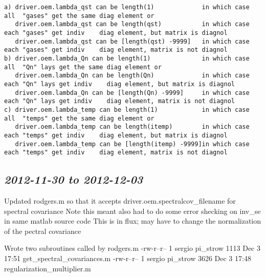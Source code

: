 \documentclass[11pt]{article}
\begin{document}
\begin{itemize}
\begin{small}
\begin{verbatim}
a) driver.oem.lambda_qst can be length(1)             in which case all  "gases" get the same diag element or
   driver.oem.lambda_qst can be length(qst)           in which case each "gases" get indiv    diag element, but matrix is diagnol
   driver.oem.lambda_qst can be [length(qst) -9999]   in which case each "gases" get indiv    diag element, matrix is not diagnol
b) driver.oem.lambda_Qn can be length(1)              in which case all  "Qn" lays get the same diag element or
   driver.oem.lambda_Qn can be length(Qn)             in which case each "Qn" lays get indiv    diag element, but matrix is diagnol
   driver.oem.lambda_Qn can be [length(Qn) -9999]     in which case each "Qn" lays get indiv    diag element, matrix is not diagnol
c) driver.oem.lambda_temp can be length(1)            in which case all  "temps" get the same diag element or
   driver.oem.lambda_temp can be length(itemp)        in which case each "temps" get indiv    diag element, but matrix is diagnol
   driver.oem.lambda_temp can be [length(itemp) -9999]in which case each "temps" get indiv    diag element, matrix is not diagnol
\end{verbatim}
\end{small}
\end{itemize}

\subsection{\textit{2012-11-30 to 2012-12-03}}
\label{sec-2_9}
Updated rodgers.m so that it accepts driver.oem.spectralcov_filename for spectral covariance
Note this meant also had to do some error shecking on inv_se in same matlab source code
This is in flux; may have to change the normalization of the pectral covariance

Wrote two subroutines called by rodgers.m
  -rw-r--r-- 1 sergio pi_strow 1113 Dec  3 17:51 get_spectral_covariances.m
  -rw-r--r-- 1 sergio pi_strow 3626 Dec  3 17:48 regularization_multiplier.m
\end{document}

